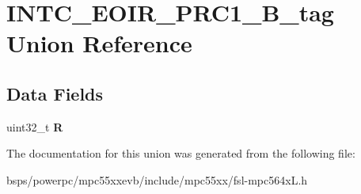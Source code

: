 \hypertarget{unionINTC__EOIR__PRC1__32B__tag}{}\section{I\+N\+T\+C\+\_\+\+E\+O\+I\+R\+\_\+\+P\+R\+C1\+\_\+B\+\_\+tag Union Reference}
\label{unionINTC__EOIR__PRC1__32B__tag}
\subsection*{Data Fields}
\begin{DoxyCompactItemize}
\item 
\mbox{\label{unionINTC__EOIR__PRC1__32B__tag_a3037e8343109e7e9459e94716ad37f3f}} 
uint32\+\_\+t {\bfseries R}
\end{DoxyCompactItemize}


The documentation for this union was generated from the following file\+:\begin{DoxyCompactItemize}
\item 
bsps/powerpc/mpc55xxevb/include/mpc55xx/fsl-\/mpc564x\+L.\+h\end{DoxyCompactItemize}
